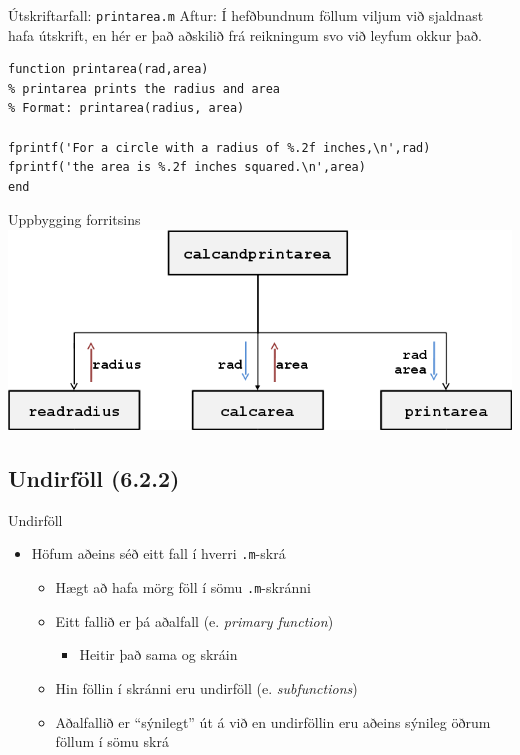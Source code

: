 \documentclass{beamer}
\begin{document}
\begin{frame}[fragile]{Útskriftarfall: \texttt{printarea.m}}
\vspace{\baselineskip}
Aftur: Í hefðbundnum föllum viljum við sjaldnast hafa útskrift, en hér er það aðskilið frá reikningum svo við leyfum okkur það.

\begin{verbatim}
function printarea(rad,area)
% printarea prints the radius and area
% Format: printarea(radius, area)

fprintf('For a circle with a radius of %.2f inches,\n',rad)
fprintf('the area is %.2f inches squared.\n',area)
end
\end{verbatim}
\end{frame}

\begin{frame}{Uppbygging forritsins}
\includegraphics[width=\textwidth]{../Pics/organization-example}
\end{frame}

\subsection{Undirföll (6.2.2)}

\begin{frame}{Undirföll}
\begin{itemize}
 \item Höfum aðeins séð eitt fall í hverri \texttt{.m}-skrá
 \begin{itemize}
  \item Hægt að hafa mörg föll í sömu \texttt{.m}-skránni
  \item Eitt fallið er þá aðalfall (e. \emph{primary function})
  \begin{itemize}
   \item Heitir það sama og skráin
  \end{itemize}
  \item Hin föllin í skránni eru undirföll (e. \emph{subfunctions})
  \item Aðalfallið er ``sýnilegt'' út á við en undirföllin eru aðeins sýnileg öðrum föllum í sömu skrá
 \end{itemize}
\end{itemize}
\end{frame}
\end{document}
